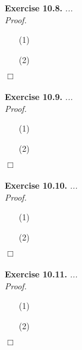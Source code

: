 \documentclass{article}
\begin{document}



\textbf{Exercise 10.8.}
\emph{...} \\

\emph{Proof.}
\begin{enumerate}
\item[(1)]
\item[(2)]

\end{enumerate}
$\Box$ \\\\






\textbf{Exercise 10.9.}
\emph{...} \\

\emph{Proof.}
\begin{enumerate}
\item[(1)]
\item[(2)]

\end{enumerate}
$\Box$ \\\\






\textbf{Exercise 10.10.}
\emph{...} \\

\emph{Proof.}
\begin{enumerate}
\item[(1)]
\item[(2)]

\end{enumerate}
$\Box$ \\\\






\textbf{Exercise 10.11.}
\emph{...} \\

\emph{Proof.}
\begin{enumerate}
\item[(1)]
\item[(2)]

\end{enumerate}
$\Box$ \\\\
\end{document}

